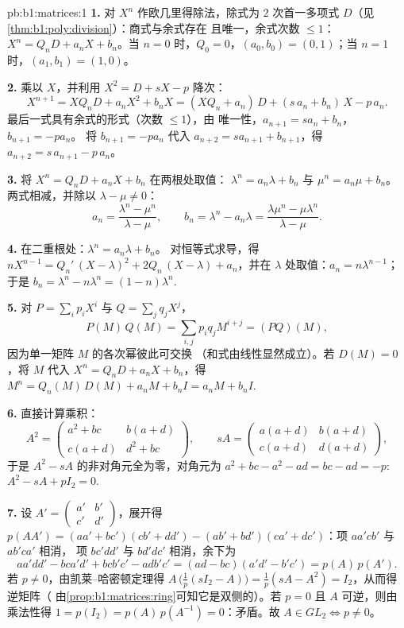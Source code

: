 \begin{solution}{pb:b1:matrices:1}
\textbf{1.} 对 $X^n$ 作欧几里得除法，除式为 $2$ 次首一多项式
$D$（见\cref{thm:b1:poly:division}）：商式与余式存在
且唯一，余式次数 $\leq 1$：$X^n =
Q_n D + a_n X + b_n$。当 $n = 0$ 时，$Q_0 = 0$，$(a_0, b_0) = (0,
1)$；当 $n = 1$ 时，$(a_1, b_1) = (1, 0)$。

\textbf{2.} 乘以 $X$，并利用 $X^2 = D + sX - p$ 降次：
\[
X^{n+1} = X Q_n D + a_n X^2 + b_n X
= (X Q_n + a_n)\,D + (s\,a_n + b_n)\,X - p\,a_n .
\]
最后一式具有余式的形式（次数 $\leq 1$），由
唯一性，$a_{n+1} = s a_n + b_n$，$b_{n+1} = -p a_n$。
将 $b_{n+1} = -pa_n$ 代入 $a_{n+2} = s a_{n+1} +
b_{n+1}$，得 $a_{n+2} = s\,a_{n+1} - p\,a_n$。

\textbf{3.} 将 $X^n = Q_n D + a_n X + b_n$ 在两根处取值：
$\lambda^n = a_n\lambda + b_n$ 与 $\mu^n = a_n\mu + b_n$。
两式相减，并除以 $\lambda - \mu \neq 0$：
\[
a_n = \frac{\lambda^n - \mu^n}{\lambda - \mu},
\qquad
b_n = \lambda^n - a_n\lambda
= \frac{\lambda\mu^n - \mu\lambda^n}{\lambda - \mu} .
\]

\textbf{4.} 在二重根处：$\lambda^n = a_n\lambda + b_n$。
对恒等式求导，得 $nX^{n-1} = Q_n'\,(X - \lambda)^2
+ 2Q_n\,(X - \lambda) + a_n$，并在 $\lambda$ 处取值：$a_n
= n\lambda^{n-1}$；于是 $b_n = \lambda^n - n\lambda^{n} = (1 -
n)\lambda^{n}$.

\textbf{5.} 对 $P = \sum_i p_i X^i$ 与 $Q = \sum_j q_j X^j$，
\[
P(M)\,Q(M) = \sum_{i,j} p_i q_j M^{i+j} = (PQ)(M),
\]
因为单一矩阵 $M$ 的各次幂彼此可交换
（和式由线性显然成立）。若 $D(M) = 0$，将 $M$
代入 $X^n = Q_n D + a_n X + b_n$，得 $M^n = Q_n(M)\,D(M) + a_n
M + b_n I = a_n M + b_n I$.

\textbf{6.} 直接计算乘积：
\[
A^2 = \begin{pmatrix}
a^2 + bc & b(a + d)\\
c(a + d) & d^2 + bc
\end{pmatrix},
\qquad
s A = \begin{pmatrix}
a(a+d) & b(a+d)\\
c(a+d) & d(a+d)
\end{pmatrix},
\]
于是 $A^2 - sA$ 的非对角元全为零，对角元为
$a^2 + bc - a^2 - ad = bc - ad = -p$: $A^2 - sA + pI_2 = 0$.

\textbf{7.} 设 $A' = \begin{pmatrix} a' & b'\\ c' &
d'\end{pmatrix}$，展开得 $p(AA') = (aa' + bc')(cb' + dd') -
(ab' + bd')(ca' + dc')$：项 $aa'cb'$ 与 $ab'ca'$ 相消，
项 $bc'dd'$ 与 $bd'dc'$ 相消，余下为
\[
aa'dd' - bca'd' + bcb'c' - adb'c'
= (ad - bc)(a'd' - b'c') = p(A)\,p(A').
\]
若 $p \neq 0$，由凯莱--哈密顿定理得 $A\,\bigl(\tfrac1p(sI_2 -
A)\bigr) = \tfrac1p(sA - A^2) = I_2$，从而得逆矩阵（
由\cref{prop:b1:matrices:ring}可知它是双侧的）。若 $p = 0$ 且
$A$ 可逆，则由乘法性得 $1 = p(I_2) =
p(A)\,p(A^{-1}) = 0$：矛盾。故 $A \in GL_2 \iff p \neq 0$。


\end{solution}

